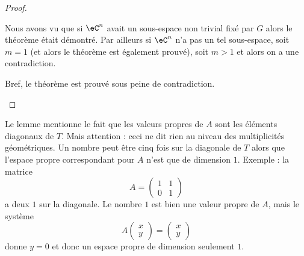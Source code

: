 \begin{proof}
\begin{subproof}
		\spitem[Conclusion]
		Nous avons vu que si \( \eC^n\) avait un sous-espace non trivial fixé par \( G\) alors le théorème était démontré. Par ailleurs si \( \eC^n\) n'a pas un tel sous-espace, soit \( m=1\) (et alors le théorème est également prouvé), soit \( m>1\) et alors on a une contradiction.

		Bref, le théorème est prouvé sous peine de contradiction.
	\end{subproof}
\end{proof}

\begin{remark}
	Le lemme mentionne le fait que les valeurs propres de \( A\) sont les éléments diagonaux de \( T\). Mais attention : ceci ne dit rien au niveau des multiplicités géométriques. Un nombre peut être cinq fois sur la diagonale de \( T\) alors que l'espace propre correspondant pour \( A\) n'est que de dimension \( 1\). Exemple : la matrice
	\begin{equation}
		A=\begin{pmatrix}
			1 & 1 \\
			0 & 1
		\end{pmatrix}
	\end{equation}
	a deux \( 1\) sur la diagonale. Le nombre \( 1\) est bien une valeur propre de \( A\), mais le système
	\begin{equation}
		A\begin{pmatrix}
			x \\
			y
		\end{pmatrix}=\begin{pmatrix}
			x \\
			y
		\end{pmatrix}
	\end{equation}
	donne \( y=0\) et donc un espace propre de dimension seulement \( 1\).
\end{remark}

